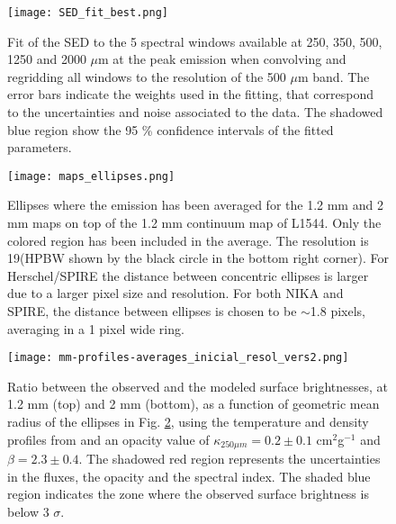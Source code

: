 \documentclass{aa}
\begin{document}
\begin{figure} 
\begin{center}
\texttt{[image: SED\_fit\_best.png]}
\end{center}
\caption{Fit of the SED to the 5 spectral windows available at 250, 350, 500, 1250 and 2000 $\mu$m at the peak emission when convolving and regridding all windows to the resolution of the 500 $\mu$m band. The error bars indicate the weights used in the fitting, that correspond to the uncertainties and noise associated to the data. The shadowed blue region show the 95 \% confidence intervals of the fitted parameters.}
\label{SED_fit}
\end{figure}

\begin{figure} 
\begin{center}
\texttt{[image: maps\_ellipses.png]}
\end{center}
\caption{Ellipses where the emission has been averaged for the 1.2 mm and 2 mm maps on top of the 1.2 mm continuum map of L1544. Only the colored region has been included in the average. The resolution is 19\arcsec (HPBW shown by the black circle in the bottom right corner). For Herschel/SPIRE the distance between concentric ellipses is larger due to a larger pixel size and resolution. For both NIKA and SPIRE, the distance between ellipses is chosen to be $\sim$1.8 pixels, averaging in a 1 pixel wide ring.}
\label{elip}
\end{figure}



\begin{figure} 
\begin{center}
\texttt{[image: mm-profiles-averages\_inicial\_resol\_vers2.png]}
\end{center}
\caption{Ratio between the observed and the modeled surface brightnesses, at 1.2 mm (top) and 2 mm (bottom), as a function of geometric mean radius of the ellipses in Fig. \ref{elip}, using the temperature and density profiles from  and an opacity value of $\kappa_{250\mu m} = 0.2 \pm 0.1$ cm$^2$g$^{-1}$ and $\beta=2.3 \pm 0.4$. The shadowed red region represents the uncertainties in the fluxes, the opacity and the spectral index. The shaded blue region indicates the zone where the observed surface brightness is below 3 $\sigma$.}
\label{profiles_mm}
\end{figure}
\end{document}
